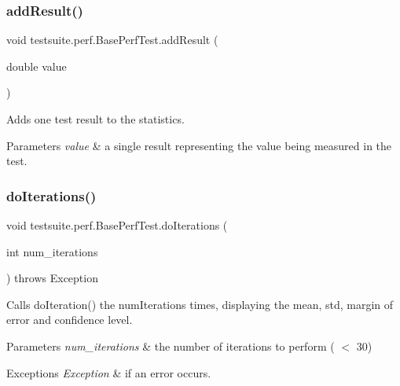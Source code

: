 \subsubsection{\texorpdfstring{add\+Result()}{addResult()}}
{\footnotesize\ttfamily void testsuite.\+perf.\+Base\+Perf\+Test.\+add\+Result (\begin{DoxyParamCaption}\item[{double}]{value }\end{DoxyParamCaption})\hspace{0.3cm}{\ttfamily [protected]}}

Adds one test result to the statistics.


\begin{DoxyParams}{Parameters}
{\em value} & a single result representing the value being measured in the test. \\
\hline
\end{DoxyParams}
\mbox{\label{classtestsuite_1_1perf_1_1_base_perf_test_a5d1d0a1bf44d9feb9603a2c98705c6c6}} 
\subsubsection{\texorpdfstring{do\+Iterations()}{doIterations()}}
{\footnotesize\ttfamily void testsuite.\+perf.\+Base\+Perf\+Test.\+do\+Iterations (\begin{DoxyParamCaption}\item[{int}]{num\+\_\+iterations }\end{DoxyParamCaption}) throws Exception\hspace{0.3cm}{\ttfamily [protected]}}

Calls do\+Iteration() the {\ttfamily num\+Iterations} times, displaying the mean, std, margin of error and confidence level.


\begin{DoxyParams}{Parameters}
{\em num\+\_\+iterations} & the number of iterations to perform ( $<$ 30) \\
\hline
\end{DoxyParams}

\begin{DoxyExceptions}{Exceptions}
{\em Exception} & if an error occurs. \\
\hline
\end{DoxyExceptions}
\mbox{\label{classtestsuite_1_1perf_1_1_base_perf_test_ac9682520790f17d153ad993c7bdf5bf4}} 
